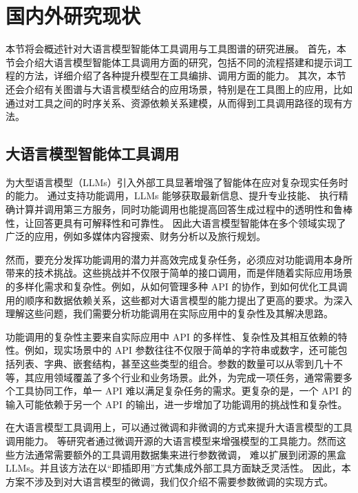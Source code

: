 \section{国内外研究现状}

本节将会概述针对大语言模型智能体工具调用与工具图谱的研究进展。
首先，本节会介绍大语言模型智能体工具调用方面的研究，包括不同的流程搭建和提示词工程的方法，详细介绍了各种提升模型在工具编排、调用方面的能力。
其次，本节还会介绍有关图谱与大语言模型结合的应用场景，特别是在工具图上的应用，比如通过对工具之间的时序关系、资源依赖关系建模，从而得到工具调用路径的现有方法。

\subsection{大语言模型智能体工具调用}

为大型语言模型（LLMs）引入外部工具显著增强了智能体在应对复杂现实任务时的能力\cite{huang2024planning, Qin2023, qu2024tool}。
通过支持功能调用，LLMs 能够获取最新信息\cite{}、提升专业技能\cite{}、
执行精确计算并调用第三方服务，同时功能调用也能提高回答生成过程中的透明性和鲁棒性，让回答更具有可解释性和可靠性。
因此大语言模型智能体在多个领域实现了广泛的应用，例如多媒体内容搜索\cite{Song2023}、财务分析\cite{theuma2024equipping}以及旅行规划\cite{hao2024large}。

然而，要充分发挥功能调用的潜力并高效完成复杂任务，必须应对功能调用本身所带来的技术挑战。这些挑战并不仅限于简单的接口调用，而是伴随着实际应用场景的多样化需求和复杂性。例如，从如何管理多种 API 的协作，到如何优化工具调用的顺序和数据依赖关系，这些都对大语言模型的能力提出了更高的要求\cite{huang2024planning, Qin2023}。为深入理解这些问题，我们需要分析功能调用在实际应用中的复杂性及其解决思路。

功能调用的复杂性主要来自实际应用中 API 的多样性、复杂性及其相互依赖的特性\cite{Qin2023}。例如，现实场景中的 API 参数往往不仅限于简单的字符串或数字，还可能包括列表、字典、嵌套结构，甚至这些类型的组合。参数的数量可以从零到几十不等，其应用领域覆盖了多个行业和业务场景\cite{ye2024tooleyes}。此外，为完成一项任务，通常需要多个工具协同工作，单一 API 难以满足复杂任务的需求\cite{huang2024planning}。更复杂的是，一个 API 的输入可能依赖于另一个 API 的输出\cite{Qin2023}，进一步增加了功能调用的挑战性和复杂性。

在大语言模型工具调用上，可以通过微调和非微调的方式来提升大语言模型的工具调用能力。
\cite{Qin2023, schick2024toolformer, hao2024toolkengpt, parisi2022talm}等研究者通过微调开源的大语言模型来增强模型的工具能力。然而这些方法通常需要额外的工具调用数据集来进行参数微调，
难以扩展到闭源的黑盒LLMs。并且该方法在以“即插即用”方式集成外部工具方面缺乏灵活性。
因此，本方案不涉及到对大语言模型的微调，我们仅介绍不需要参数微调的实现方式。

